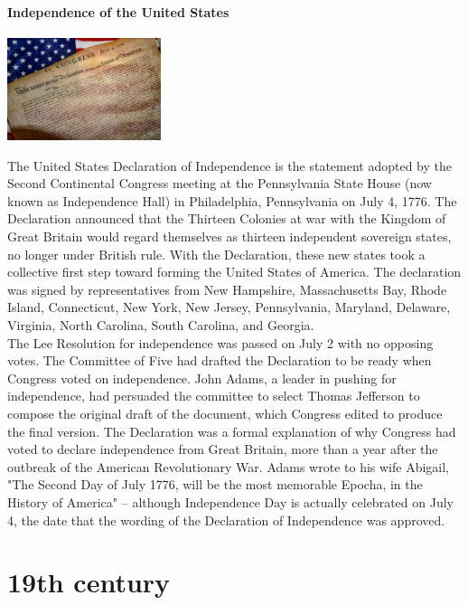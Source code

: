 \documentclass[11pt]{report}
\begin{document}
\subsection{Independence of the United States}
\vspace{2mm}\begin{center}\includegraphics[width=4.5cm]{./img/usaIndep.jpg}\end{center}
The United States Declaration of Independence is the statement adopted by the Second Continental Congress meeting at the Pennsylvania State House (now known as Independence Hall) in Philadelphia, Pennsylvania on July 4, 1776. The Declaration announced that the Thirteen Colonies at war with the Kingdom of Great Britain would regard themselves as thirteen independent sovereign states, no longer under British rule. With the Declaration, these new states took a collective first step toward forming the United States of America. The declaration was signed by representatives from New Hampshire, Massachusetts Bay, Rhode Island, Connecticut, New York, New Jersey, Pennsylvania, Maryland, Delaware, Virginia, North Carolina, South Carolina, and Georgia.\\
The Lee Resolution for independence was passed on July 2 with no opposing votes. The Committee of Five had drafted the Declaration to be ready when Congress voted on independence. John Adams, a leader in pushing for independence, had persuaded the committee to select Thomas Jefferson to compose the original draft of the document, which Congress edited to produce the final version. The Declaration was a formal explanation of why Congress had voted to declare independence from Great Britain, more than a year after the outbreak of the American Revolutionary War. Adams wrote to his wife Abigail, "The Second Day of July 1776, will be the most memorable Epocha, in the History of America" – although Independence Day is actually celebrated on July 4, the date that the wording of the Declaration of Independence was approved.

						
\part{19th century}
\end{document}
